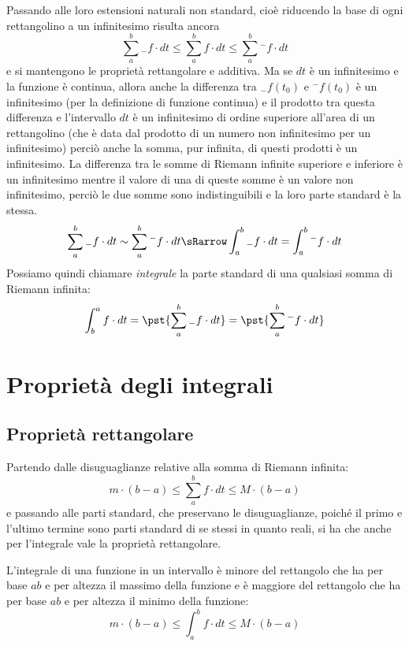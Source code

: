   Passando alle loro estensioni naturali non standard, cioè riducendo la base 
di ogni rettangolino a un infinitesimo risulta ancora 
\[\sum_a^b {}_{-}f \cdot dt \le \sum_a^b f \cdot dt \le 
  \sum_a^b {}^{-}f \cdot dt\] 
e si mantengono le proprietà rettangolare e additiva. 
Ma se \(dt\) è un infinitesimo e la funzione è continua, allora anche la 
differenza tra \({}_{-}f(t_0)\) e \({}^{-}f(t_0)\) è un infinitesimo (per la 
definizione di funzione continua) e il prodotto tra questa differenza e 
l'intervallo \(dt\) è un infinitesimo di ordine superiore 
all'area di un rettangolino 
(che è data dal prodotto di un numero non infinitesimo per un infinitesimo) 
perciò anche la somma, pur infinita, di questi prodotti è un infinitesimo. 
La differenza tra le somme di Riemann infinite 
superiore e inferiore è un infinitesimo mentre il valore di una di queste 
somme è un valore non infinitesimo, perciò le due somme sono indistinguibili 
e la loro parte standard è la stessa.
\[\sum_a^b {}_{-}f \cdot dt \sim \sum_a^b {}^{-}f \cdot dt \sRarrow 
  \int_a^b {}_{-}f \cdot dt = \int_a^b {}^{-}f \cdot dt\]
Possiamo quindi chiamare \emph{integrale} la parte standard di una 
qualsiasi somma di Riemann infinita:
\[\int_b^a f \cdot dt = \pst{\sum_a^b {}_{-}f \cdot dt} =
                        \pst{\sum_a^b {}^{-}f \cdot dt}\]

\section{Proprietà degli integrali}
\label{sec:integrali_proprieta}

\subsection{Proprietà rettangolare}
\label{subsec:integrali_proprieta_rettangolare}

Partendo dalle disuguaglianze relative alla somma di Riemann infinita:
\[m \cdot (b - a) \le  \sum_a^b f \cdot dt  \le M\cdot(b - a)\]
e passando alle parti standard, che 
preservano le disuguaglianze, poiché il primo e l'ultimo termine sono parti 
standard di se stessi in quanto reali, si ha che anche per 
l'integrale vale la proprietà rettangolare.
\begin{newtheo}{}{}
L'integrale di una funzione in un intervallo è minore del rettangolo che 
ha per base \(ab\) e per altezza il massimo della funzione e è maggiore del 
rettangolo che ha per base \(ab\) e per altezza il minimo della funzione:
\[m \cdot(b - a) \le  \int_a^b f \cdot dt  \le M\cdot(b - a)\] 
\end{newtheo}

